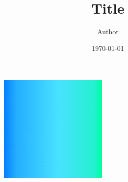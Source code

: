 \documentclass[a4paper,10pt,dvipdfmx]{ujarticle}
\title{Title}
\author{Author}
\date{\today}
\begin{document}
	\maketitle
	\begin{figure}[hptb]
		\centering
		\includegraphics[width=.1\textwidth]{../example.png}
	\end{figure}
\end{document}
